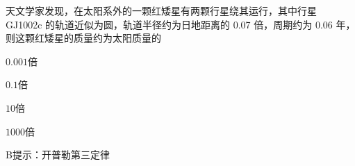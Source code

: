 天文学家发现，在太阳系外的一颗红矮星有两颗行星绕其运行，其中行星 GJ1002c 的轨道近似为圆，轨道半径约为日地距离的 0.07 倍，周期约为 0.06 年，则这颗红矮星的质量约为太阳质量的\paren[]
\begin{choices}
	\item \(0.001\)倍
	\item \(0.1\)倍
	\item \(10\)倍
	\item \(1000\)倍
\end{choices}
\begin{answer}
	B\qquad 提示：开普勒第三定律
\end{answer}